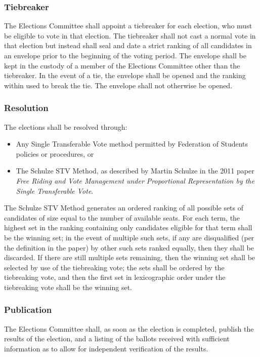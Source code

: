\subsubsection{Tiebreaker}
The Elections Committee shall appoint a tiebreaker for each election, who must
be eligible to vote in that election. The tiebreaker shall not cast a normal
vote in that election but instead shall seal and date a strict ranking of all
candidates in an envelope prior to the beginning of the voting period. The
envelope shall be kept in the custody of a member of the Elections Committee
other than the tiebreaker. In the event of a tie, the envelope shall be opened
and the ranking within used to break the tie. The envelope shall not otherwise
be opened.

\subsubsection{Resolution}
The elections shall be resolved through:

\begin{itemize}
    \item Any Single Transferable Vote method permitted by Federation of Students policies or procedures, or
    \item The Schulze STV Method, as described by
Martin Schulze in the 2011 paper \emph{Free Riding and Vote Management under Proportional Representation by the Single Transferable Vote}.
\end{itemize}

The Schulze STV
Method generates an ordered ranking of all possible sets of candidates of size
equal to the number of available seats. For each term, the highest set in the
ranking containing only candidates eligible for that term shall be the winning
set; in the event of multiple such sets, if any are disqualified (per the
definition in the paper) by other such sets ranked equally, then they shall be
discarded. If there are still multiple sets remaining, then the winning set
shall be selected by use of the tiebreaking vote; the sets shall be ordered by
the tiebreaking vote, and then the first set in lexicographic order under the
tiebreaking vote shall be the winning set.

\subsubsection{Publication}
The Elections Committee shall, as soon as the election is completed, publish the
results of the election, and a listing of the ballots received with sufficient
information as to allow for independent verification of the results.

